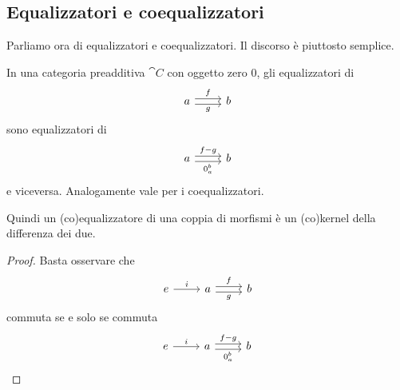 \subsection{Equalizzatori e coequalizzatori}

Parliamo ora di equalizzatori e coequalizzatori. Il discorso è piuttosto
semplice.

\begin{proposition}
  In una categoria preadditiva \(\cat C\) con oggetto zero \(0\), gli
  equalizzatori di
  \[
    \begin{tikzcd}
      a \ar["f", r, shift left] \ar["g", r, shift right, swap] & b
    \end{tikzcd}
  \]
  sono equalizzatori di
  \[
    \begin{tikzcd}
      a \ar["{f-g}", r, shift left] \ar["{0_a^b}", r, shift right, swap]
      & b
    \end{tikzcd}
  \]
  e viceversa. Analogamente vale per i coequalizzatori.
\end{proposition}

Quindi un (co)equalizzatore di una coppia di morfismi è un (co)kernel
della differenza dei due.

\begin{proof}
  Basta osservare che
  \[
    \begin{tikzcd}
      e \ar["i", r] & a \ar["f", r, shift left] \ar["g", r, shift right,
      swap] & b
    \end{tikzcd}
  \]
  commuta se e solo se commuta
  \[
    \begin{tikzcd}
      e \ar["i", r] & a \ar["{f-g}", r, shift left] \ar["{0_a^b}", r,
      shift right, swap] & b
    \end{tikzcd}
    \qedhere\]
\end{proof}



